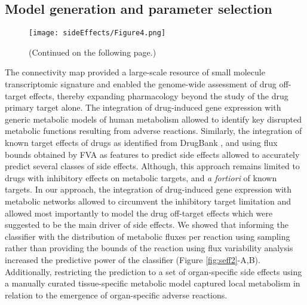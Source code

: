 \subsection{Model generation and parameter selection}
\begin{figure}[!htp]
\centering
	\texttt{[image: sideEffects/Figure4.png]}%
	\caption[Drug community detection.]{(Continued on the following page.)}
	\label{fig:seff4}
\end{figure}
\begin{figure}[t]
\end{figure}
The connectivity map \cite{subramanian2017next} provided a large-scale resource of small molecule transcriptomic signature and enabled the genome-wide assessment of drug off-target effects, thereby expanding pharmacology beyond the study of the drug primary target alone. The integration of drug-induced gene expression with generic metabolic models of human metabolism allowed to identify key disrupted metabolic functions \cite{zielinski2015pharmacogenomic} resulting from adverse reactions. Similarly, the integration of known target effects of drugs as identified from DrugBank \cite{wishart2017drugbank}, and using flux bounds obtained by FVA as features to predict side effects \cite{shaked2016metabolic} allowed to accurately predict several classes of side effects. Although, this approach remains limited to drugs with inhibitory effects on metabolic targets, and \textit{a fortiori} of known targets. In our approach, the integration of drug-induced gene expression with metabolic networks allowed to circumvent the inhibitory target limitation \cite{sahoo2015modeling} and allowed most importantly to model the drug off-target effects which were suggested to be the main driver of side effects. We showed that informing the classifier with the distribution of metabolic fluxes per reaction using sampling rather than providing the bounds of the reaction using flux variability analysis increased the predictive power of the classifier (Figure \ref{fig:seff2}-A,B). Additionally, restricting the prediction to a set of organ-specific side effects using a manually curated tissue-specific metabolic model captured local metabolism in relation to the emergence of organ-specific adverse reactions.\\
